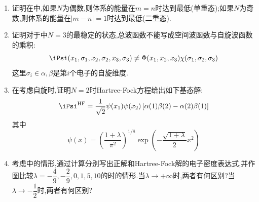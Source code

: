 \documentclass{ctexart}
\begin{document}
\begin{homework}[8.]
\begin{enumerate}[label=\tbf{(\alph*)}]
\[\begin{vmatrix}
            \vdots&\vdots&\ddots&\vdots\\
            x_1^{n-1}\beta(1)&x_2^{n-1}\beta(2)&\cdots&x_N^{n-1}\beta(N)
        \end{vmatrix}\iPsi_0\]
        这里$C$是归一化系数, $\alpha(k)$表示第$k$个标号的电子是$\alpha$电子, $\beta(l)$表示第$l$个标号的电子为$\beta$电子. $\iPsi$对应的本征能量为
        \[E=\dfrac{1+(m^2+n^2-1)(N\theta+1)}{2}\]
        \item 证明在中,如果$N$为偶数,则体系的能量在$m=n$时达到最低(单重态);如果$N$为奇数,则体系的能量在$|m-n|=1$时达到最低(二重态).
        \item 证明对于中$N=3$的最稳定的状态,总波函数不能写成空间波函数与自旋波函数的乘积:
        \[\iPsi(x_1,\sigma_1,x_2,\sigma_2,x_3,\sigma_3)\neq\Phi(x_1,x_2,x_3)\chi(\sigma_1,\sigma_2,\sigma_3)\]
        这里$\sigma_i\in{\alpha,\beta}$是第$i$个电子的自旋维度.
        \item 在考虑自旋时,证明$N=2$时Hartree-Fock方程给出如下基态解:
        \[\iPsi^{\text{HF}}=\dfrac{1}{\sqrt2}\psi(x_1)\psi(x_2)\left[\alpha(1)\beta(2)-\alpha(2)\beta(1)\right]\]
        其中
        \[\psi(x)=\left(\dfrac{1+\lambda}{\pi^2}\right)^{1/8}\exp\left(-\dfrac{\sqrt{1+\lambda}}{2}x^2\right)\]
        \item 考虑中的情形,通过计算分别写出正解和Hartree-Fock解的电子密度表达式,并作图比较$\lambda=-\dfrac49,-\dfrac29,0,1,5,10$的时的情形.当$\lambda\to+\infty$时,两者有何区别?当$\lambda\to-\dfrac12$时,两者有何区别?
    \end{enumerate}
\end{homework}
\end{document}
